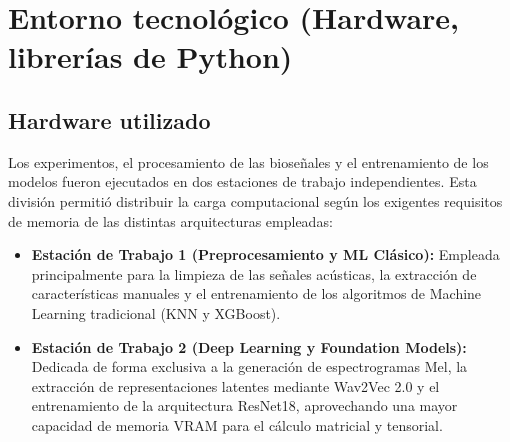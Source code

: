 \section{Entorno tecnológico (Hardware, librerías de Python)}
    \subsection{Hardware utilizado}
        Los experimentos, el procesamiento de las bioseñales y el entrenamiento de los modelos fueron ejecutados en dos estaciones de trabajo independientes. Esta división permitió distribuir la carga computacional según los exigentes requisitos de memoria de las distintas arquitecturas empleadas:

        \begin{itemize}
            \item \textbf{Estación de Trabajo 1 (Preprocesamiento y ML Clásico):} Empleada principalmente para la limpieza de las señales acústicas, la extracción de características manuales y el entrenamiento de los algoritmos de Machine Learning tradicional (KNN y XGBoost).
            \item \textbf{Estación de Trabajo 2 (Deep Learning y Foundation Models):} Dedicada de forma exclusiva a la generación de espectrogramas Mel, la extracción de representaciones latentes mediante Wav2Vec 2.0 y el entrenamiento de la arquitectura ResNet18, aprovechando una mayor capacidad de memoria VRAM para el cálculo matricial y tensorial.
        \end{itemize}

